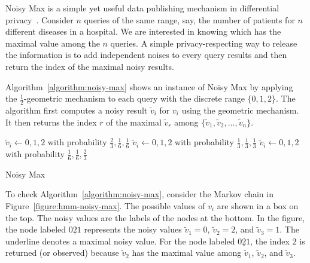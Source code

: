 
Noisy Max is a simple yet useful data publishing mechanism in
differential privacy~\cite{DR:14:AFDP,DWWZK:18:DVDP}. Consider $n$
queries of the same range, say, the number of patients for $n$
different diseases in a hospital. We are interested in knowing which
has the maximal value among the $n$ queries. A simple
privacy-respecting way to release the information is to add
independent noises to every query results and then return the index of
the maximal noisy results.

Algorithm~\ref{algorithm:noisy-max} shows an instance of Noisy Max by
applying the $\frac{1}{2}$-geometric mechanism to each query with
the discrete range $\{ 0, 1, 2 \}$. The algorithm first computes
a noisy result $\tilde{v}_i$ for $v_i$ using the geometric
mechanism. It then returns the index $r$ of the maximal
$\tilde{v}_r$ among $\{ \tilde{v}_1, \tilde{v}_2, \ldots, \tilde{v}_n
\}$. 
 

\begin{algorithm}
  \begin{algorithmic}[1]
                {$\tilde{v}_i \leftarrow 0, 1, 2$ with probability
                 $\frac{2}{3}, \frac{1}{6}, \frac{1}{6}$}
                {$\tilde{v}_i \leftarrow 0, 1, 2$ with probability
                 $\frac{1}{3}, \frac{1}{3}, \frac{1}{3}$}
                {$\tilde{v}_i \leftarrow 0, 1, 2$ with probability
                 $\frac{1}{6}, \frac{1}{6}, \frac{2}{3}$}
        \EndMatch
      \EndFor
    \EndFunction
  \end{algorithmic}
  \caption{Noisy Max}
  \label{algorithm:noisy-max}
\end{algorithm}

To check Algorithm~\ref{algorithm:noisy-max}, consider the Markov
chain in Figure~\ref{figure:hmm-noisy-max}. The possible values of
$v_i$ are shown in a box on the top. The noisy values are the labels
of the nodes at the bottom. In the figure, the node labeled
$0\underline{2}1$ represents the noisy values $\tilde{v}_1 = 0$,
$\tilde{v}_2 = 2$, and $\tilde{v}_3 = 1$. The underline denotes a
maximal noisy value. For the node labeled $0\underline{2}1$, the index
$2$ is returned (or observed) because $\tilde{v}_2$ has the maximal
value among $\tilde{v}_1$, $\tilde{v}_2$, and $\tilde{v}_3$.


